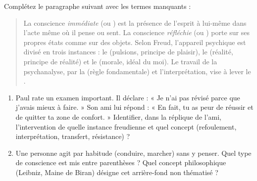 \documentclass[11pt]{article}
\begin{document}
\begin{exercice}
Complétez le paragraphe suivant avec les termes manquants :
\begin{quote}
La conscience \textit{immédiate} (ou \underline{\hspace{3cm}}) est la présence de l'esprit à lui-même dans l'acte même où il pense ou sent. La conscience \textit{réfléchie} (ou \underline{\hspace{3cm}}) porte sur ses propres états comme sur des objets. Selon Freud, l'appareil psychique est divisé en trois instances : le \underline{\hspace{2cm}} (pulsions, principe de plaisir), le \underline{\hspace{2cm}} (réalité, principe de réalité) et le \underline{\hspace{2cm}} (morale, idéal du moi). Le travail de la psychanalyse, par la \underline{\hspace{3cm}} (règle fondamentale) et l'interprétation, vise à lever le \underline{\hspace{2cm}}.
\end{quote}
\end{exercice}

\begin{exercice}
\begin{enumerate}
    \item Paul rate un examen important. Il déclare : « Je n'ai pas révisé parce que j'avais mieux à faire. » Son ami lui répond : « En fait, tu as peur de réussir et de quitter ta zone de confort. » Identifier, dans la réplique de l'ami, l'intervention de quelle instance freudienne et quel concept (refoulement, interprétation, transfert, résistance) ?
    \item Une personne agit par habitude (conduire, marcher) sans y penser. Quel type de conscience est mis entre parenthèses ? Quel concept philosophique (Leibniz, Maine de Biran) désigne cet arrière-fond non thématisé ?
\end{enumerate}
\end{exercice}
\end{document}
